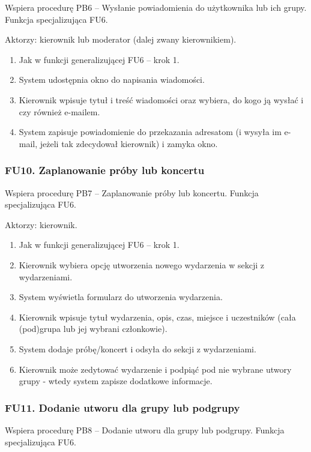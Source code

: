 \documentclass[11pt,a4paper]{article}
\renewcommand{\_}{\char`_}
\begin{document}
Wspiera procedurę PB6 – Wysłanie powiadomienia do użytkownika lub ich grupy. Funkcja specjalizująca FU6.

Aktorzy: kierownik lub moderator (dalej zwany kierownikiem).
\begin{enumerate}
    \item Jak w funkcji generalizującej FU6 – krok 1.
    \item System udostępnia okno do napisania wiadomości.
    \item Kierownik wpisuje tytuł i treść wiadomości oraz wybiera, do kogo ją wysłać i czy również e-mailem.
    \item System zapisuje powiadomienie do przekazania adresatom (i wysyła im e-mail, jeżeli tak zdecydował kierownik) i zamyka okno.
\end{enumerate}

\subsubsection{FU10. Zaplanowanie próby lub koncertu}

Wspiera procedurę PB7 – Zaplanowanie próby lub koncertu. Funkcja specjalizująca FU6.

Aktorzy: kierownik.
\begin{enumerate}
    \item Jak w funkcji generalizującej FU6 – krok 1.
    \item Kierownik wybiera opcję utworzenia nowego wydarzenia w sekcji z wydarzeniami.
    \item System wyświetla formularz do utworzenia wydarzenia.
    \item Kierownik wpisuje tytuł wydarzenia, opis, czas, miejsce i uczestników (cała (pod)grupa lub jej wybrani członkowie).
    \item System dodaje próbę/koncert i odsyła do sekcji z wydarzeniami.
    \item Kierownik może zedytować wydarzenie i podpiąć pod nie wybrane utwory grupy - wtedy system zapisze dodatkowe informacje.
\end{enumerate}

\subsubsection{FU11. Dodanie utworu dla grupy lub podgrupy}

Wspiera procedurę PB8 – Dodanie utworu dla grupy lub podgrupy. Funkcja specjalizująca FU6.
\end{document}
